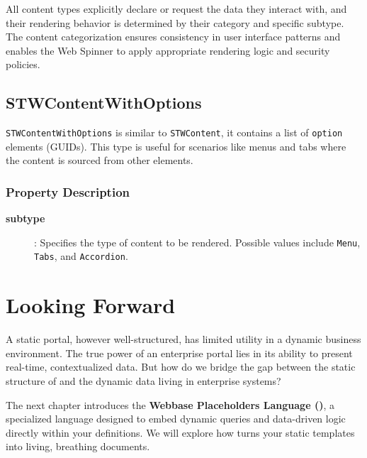 All content types explicitly declare or request the data they interact with, and their rendering behavior is determined by their category and specific subtype. The content categorization ensures consistency in user interface patterns and enables the Web Spinner to apply appropriate rendering logic and security policies.

\subsection{STWContentWithOptions}

\texttt{STWContentWithOptions} is similar to \texttt{STWContent}, it contains a list of \texttt{option} elements (GUIDs). This type is useful for scenarios like menus and tabs where the content is sourced from other elements.

\subsubsection{Property Description}

\begin{description}
\item[\textbf{subtype}]: Specifies the type of content to be rendered. Possible values include \texttt{Menu}, \texttt{Tabs}, and \texttt{Accordion}.
\end{description}

\section{Looking Forward}
\label{sec:wbol-forward}

A static portal, however well-structured, has limited utility in a dynamic business environment. The true power of an enterprise portal lies in its ability to present real-time, contextualized data. But how do we bridge the gap between the static structure of \wbol{} and the dynamic data living in enterprise systems?

The next chapter introduces the \textbf{Webbase Placeholders Language (\wbpl{})}, a specialized language designed to embed dynamic queries and data-driven logic directly within your \wbol{} definitions. We will explore how \wbpl{} turns your static templates into living, breathing documents.
